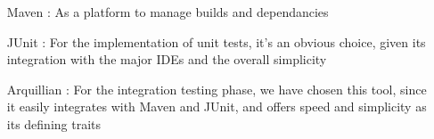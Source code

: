 \begin{itemize}
  \item[Maven]: As a platform to manage builds and dependancies
  \item[JUnit]: For the implementation of unit tests, it's an obvious choice,
    given its integration with the major IDEs and the overall simplicity
  \item[Arquillian]: For the integration testing phase, we have chosen this
    tool, since it easily integrates with Maven and JUnit, and offers
    speed and simplicity as its defining traits
\end{itemize}
